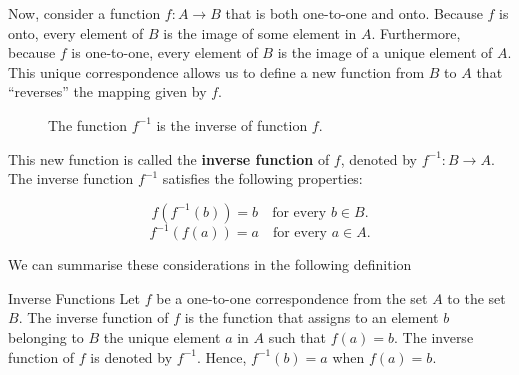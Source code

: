 Now, consider a function \( f: A \rightarrow B \) that is both one-to-one and onto. Because \( f \) is onto, every element of \( B \) is the image of some element in \( A \). Furthermore, because \( f \) is one-to-one, every element of \( B \) is the image of a unique element of \( A \). This unique correspondence allows us to define a new function from \( B \) to \( A \) that ``reverses'' the mapping given by \( f \).

\begin{figure}[h]
\centering
{}
\caption{The function $f^{-1}$ is the inverse of function $f$.}
\label{fig:inv}
\end{figure}

This new function is called the \textbf{inverse function} of \( f \), denoted by \( f^{-1}: B \rightarrow A \). The inverse function \( f^{-1} \) satisfies the following properties:

\[
f(f^{-1}(b)) = b \quad \text{for every } b \in B.
\]
\[
f^{-1}(f(a)) = a \quad \text{for every } a \in A.
\]

We can summarise these considerations in the following definition

\begin{definition}{Inverse Functions}
Let $f$ be a one-to-one correspondence from the set $A$ to the set $B$. The inverse function of $f$ is the function that assigns to an element $b$ belonging to $B$ the unique element $a$ in $A$ such that $f(a)=b$. The inverse function of $f$ is denoted by $f^{-1}$. Hence, $f^{-1}(b)=a$ when $f(a)=b$.    
\end{definition}

